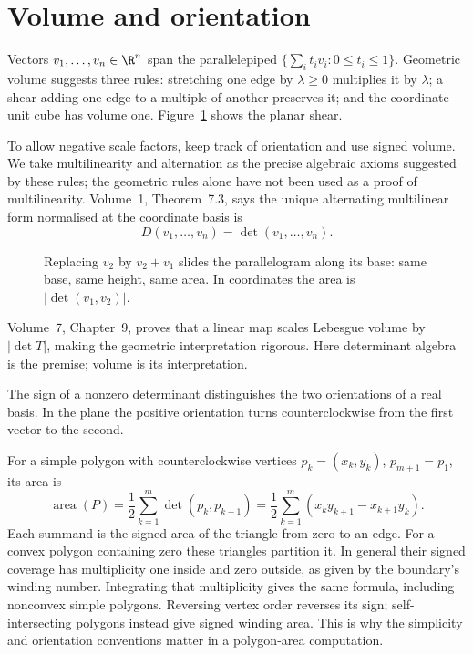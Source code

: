 \section{Volume and orientation}

Vectors $v_1,\ldots,v_n\in\R^n$ span the parallelepiped $\{\sum_it_iv_i:0\le t_i\le1\}$. Geometric volume suggests three rules: stretching one edge by $\lambda\ge0$ multiplies it by $\lambda$; a shear adding one edge to a multiple of another preserves it; and the coordinate unit cube has volume one. Figure~\ref{linear:fig:shear} shows the planar shear.

To allow negative scale factors, keep track of orientation and use signed volume. We take multilinearity and alternation as the precise algebraic axioms suggested by these rules; the geometric rules alone have not been used as a proof of multilinearity. Volume~1, Theorem~7.3, says the unique alternating multilinear form normalised at the coordinate basis is
\[D(v_1,\ldots,v_n)=\det(v_1,\ldots,v_n).
\]
\begin{figure}[ht]
\centering
{}
\caption{Replacing $v_2$ by $v_2+v_1$ slides the parallelogram along its base: same base, same height, same area. In
coordinates the area is $|\det(v_1,v_2)|$.}
\label{linear:fig:shear}
\end{figure}

\begin{remark}
Volume~7, Chapter~9, proves that a linear map scales Lebesgue volume by $|\det T|$, making the geometric interpretation rigorous. Here determinant algebra is the premise; volume is its interpretation.
\end{remark}

The sign of a nonzero determinant distinguishes the two orientations of a real basis. In the plane the positive orientation turns counterclockwise from the first vector to the second.

\begin{example}\label{linear:ex:shoelace}
For a simple polygon with counterclockwise vertices $p_k=(x_k,y_k)$, $p_{m+1}=p_1$, its area is
\[\operatorname{area}(P)=\frac12\sum_{k=1}^m\det(p_k,p_{k+1})
 =\frac12\sum_{k=1}^m(x_ky_{k+1}-x_{k+1}y_k).
\]
Each summand is the signed area of the triangle from zero to an edge. For a convex polygon containing zero these triangles partition it. In general their signed coverage has multiplicity one inside and zero outside, as given by the boundary's winding number. Integrating that multiplicity gives the same formula, including nonconvex simple polygons. Reversing vertex order reverses its sign; self-intersecting polygons instead give signed winding area. This is why the simplicity and orientation conventions matter in a polygon-area computation.
\end{example}

